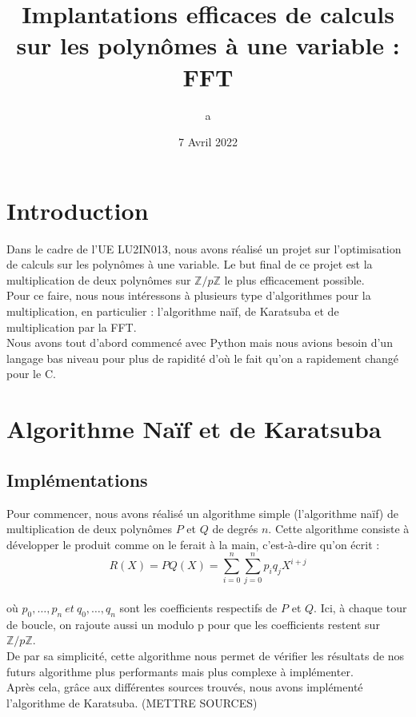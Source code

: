 \documentclass[12pt, a4paper]{article}
\title{Implantations efficaces de calculs sur les polynômes à une variable : FFT}
\author{a}
\date{7 Avril 2022}
\begin{document}
\maketitle
\tableofcontents
\newpage

\section*{Introduction}
Dans le cadre de l'UE LU2IN013, nous avons réalisé un projet sur l'optimisation de calculs sur les polynômes à une variable. Le but final de ce projet est la multiplication de deux polynômes sur $\mathbb{Z}/p\mathbb{Z}$ le plus efficacement possible.\\
Pour ce faire, nous nous intéressons à plusieurs type d'algorithmes pour la multiplication, en particulier : l'algorithme naïf, de Karatsuba et de multiplication par la FFT.\\
Nous avons tout d'abord commencé avec Python mais nous avions besoin d'un langage bas niveau pour plus de rapidité d'où le fait qu'on a rapidement changé pour le C.

\section{Algorithme Naïf et de Karatsuba}
\subsection{Implémentations}

Pour commencer, nous avons réalisé un algorithme simple (l'algorithme naïf) de multiplication de deux polynômes $P$ et $Q$ de degrés $n$. Cette algorithme consiste à développer le produit comme on le ferait à la main, c'est-à-dire qu'on écrit : \\
\[R(X) = PQ(X) =
\displaystyle\sum_{i=0}^{n}\sum_{j=0}^{n} p_i q_j X^{i+j}\] \\
où $p_0,\dots,p_n\ et\ q_0,\dots,q_n$ sont les coefficients respectifs de $P$ et $Q$. Ici, à chaque tour de boucle, on rajoute aussi un modulo p pour que les coefficients restent sur $\mathbb{Z}/p\mathbb{Z}$.\\
De par sa simplicité, cette algorithme nous permet de vérifier les résultats de nos futurs algorithme plus performants mais plus complexe à implémenter.\\
Après cela, grâce aux différentes sources 
trouvés, nous avons implémenté l'algorithme de Karatsuba. (METTRE SOURCES)
\end{document}
